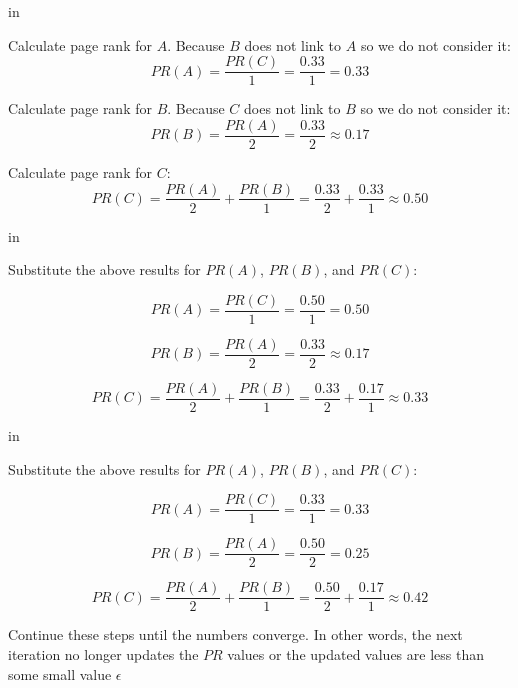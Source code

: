 \documentclass[handout,sanserif,mathserif]{beamer}
\begin{document}
\begin{frame}

{\color{RoyalBlue}{\Large First iteration}}

 in

Calculate page rank for $A$.  Because $B$ does not link to $A$ so we do not consider it:
$$
PR(A) = \frac{PR(C)}{1} = \frac{0.33}{1} = 0.33
$$

Calculate page rank for $B$.  Because $C$ does not link to $B$ so we do not consider it:
$$
PR(B) = \frac{PR(A)}{2} = \frac{0.33}{2} \approx 0.17
$$

Calculate page rank for $C$:
$$ 
PR(C) = \frac{PR(A)}{2} + \frac{PR(B)}{1} = \frac{0.33}{2} + \frac{0.33}{1} \approx 0.50
$$

\end{frame}

\begin{frame}

{\color{RoyalBlue}{\Large Second iteration}}
 in

Substitute the above results for $PR(A)$, $PR(B)$, and $PR(C)$:

$$
PR(A) = \frac{PR(C)}{1} = \frac{0.50}{1} = 0.50
$$

$$
PR(B) = \frac{PR(A)}{2} = \frac{0.33}{2} \approx 0.17
$$

$$ 
PR(C) = \frac{PR(A)}{2} + \frac{PR(B)}{1} = \frac{0.33}{2} + \frac{0.17}{1} \approx 0.33
$$

\end{frame}

\begin{frame}

{\color{RoyalBlue}{\Large Third iteration}}
 in

Substitute the above results for $PR(A)$, $PR(B)$, and $PR(C)$:

$$
PR(A) = \frac{PR(C)}{1} = \frac{0.33}{1} = 0.33
$$

$$
PR(B) = \frac{PR(A)}{2} = \frac{0.50}{2} = 0.25
$$

$$ 
PR(C) = \frac{PR(A)}{2} + \frac{PR(B)}{1} = \frac{0.50}{2} + \frac{0.17}{1} \approx 0.42
$$

Continue these steps until the numbers converge.  In other words, the next iteration no longer updates the $PR$ values or the updated values are less than some small value $\epsilon$

\end{frame}
\end{document}
